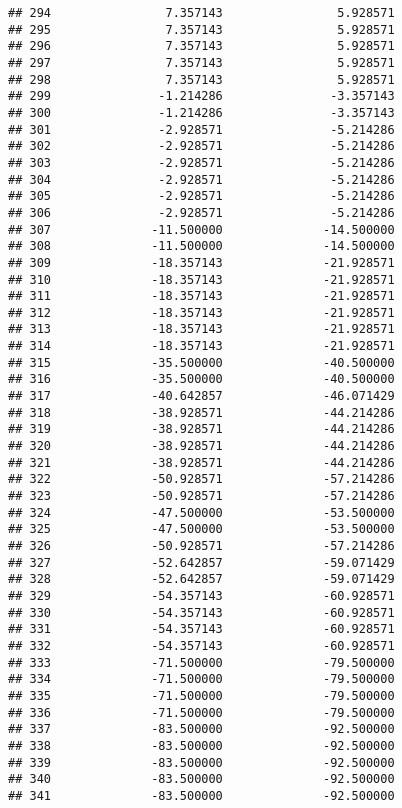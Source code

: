 \documentclass[]{article}
\begin{document}
\begin{verbatim}
## 294                7.357143                5.928571
## 295                7.357143                5.928571
## 296                7.357143                5.928571
## 297                7.357143                5.928571
## 298                7.357143                5.928571
## 299               -1.214286               -3.357143
## 300               -1.214286               -3.357143
## 301               -2.928571               -5.214286
## 302               -2.928571               -5.214286
## 303               -2.928571               -5.214286
## 304               -2.928571               -5.214286
## 305               -2.928571               -5.214286
## 306               -2.928571               -5.214286
## 307              -11.500000              -14.500000
## 308              -11.500000              -14.500000
## 309              -18.357143              -21.928571
## 310              -18.357143              -21.928571
## 311              -18.357143              -21.928571
## 312              -18.357143              -21.928571
## 313              -18.357143              -21.928571
## 314              -18.357143              -21.928571
## 315              -35.500000              -40.500000
## 316              -35.500000              -40.500000
## 317              -40.642857              -46.071429
## 318              -38.928571              -44.214286
## 319              -38.928571              -44.214286
## 320              -38.928571              -44.214286
## 321              -38.928571              -44.214286
## 322              -50.928571              -57.214286
## 323              -50.928571              -57.214286
## 324              -47.500000              -53.500000
## 325              -47.500000              -53.500000
## 326              -50.928571              -57.214286
## 327              -52.642857              -59.071429
## 328              -52.642857              -59.071429
## 329              -54.357143              -60.928571
## 330              -54.357143              -60.928571
## 331              -54.357143              -60.928571
## 332              -54.357143              -60.928571
## 333              -71.500000              -79.500000
## 334              -71.500000              -79.500000
## 335              -71.500000              -79.500000
## 336              -71.500000              -79.500000
## 337              -83.500000              -92.500000
## 338              -83.500000              -92.500000
## 339              -83.500000              -92.500000
## 340              -83.500000              -92.500000
## 341              -83.500000              -92.500000

\end{verbatim}
\end{document}
